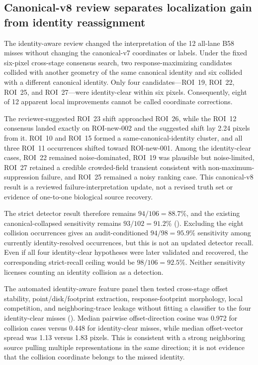 \subsection{Canonical-v8 review separates localization gain from identity reassignment}

The identity-aware review changed the interpretation of the 12 all-lane B58
misses without changing the canonical-v7 coordinates or labels. Under the fixed
six-pixel cross-stage consensus search, two response-maximizing candidates
collided with another geometry of the same canonical identity and six collided
with a different canonical identity. Only four candidates---ROI~19, ROI~22,
ROI~25, and ROI~27---were identity-clear within six pixels. Consequently, eight
of 12 apparent local improvements cannot be called coordinate corrections.

The reviewer-suggested ROI~23 shift approached ROI~26, while the ROI~12
consensus landed exactly on ROI-new-002 and the suggested shift lay 2.24 pixels
from it. ROI~10 and ROI~15 formed a same-canonical-identity cluster, and all
three ROI~11 occurrences shifted toward ROI-new-001. Among the identity-clear
cases, ROI~22 remained noise-dominated, ROI~19 was plausible but noise-limited,
ROI~27 retained a credible crowded-field transient consistent with
non-maximum-suppression failure, and ROI~25 remained a noisy ranking case. This
canonical-v8 result is a reviewed failure-interpretation update, not a revised
truth set or evidence of one-to-one biological source recovery.

The strict detector result therefore remains $94/106=88.7\%$, and the existing
canonical-collapsed sensitivity remains $93/102=91.2\%$
(). Excluding the eight collision occurrences gives
an audit-conditioned $94/98=95.9\%$ sensitivity among currently
identity-resolved occurrences, but this is not an updated detector recall. Even
if all four identity-clear hypotheses were later validated and recovered, the
corresponding strict-recall ceiling would be $98/106=92.5\%$. Neither
sensitivity licenses counting an identity collision as a detection.



The automated identity-aware feature panel then tested cross-stage offset
stability, point/disk/footprint extraction, response-footprint morphology,
local competition, and neighboring-trace leakage without fitting a classifier
to the four identity-clear misses (). Median
pairwise offset-direction cosine was 0.972 for collision cases versus 0.448 for
identity-clear misses, while median offset-vector spread was 1.13 versus 1.83
pixels. This is consistent with a strong neighboring source pulling multiple
representations in the same direction; it is not evidence that the collision
coordinate belongs to the missed identity.

